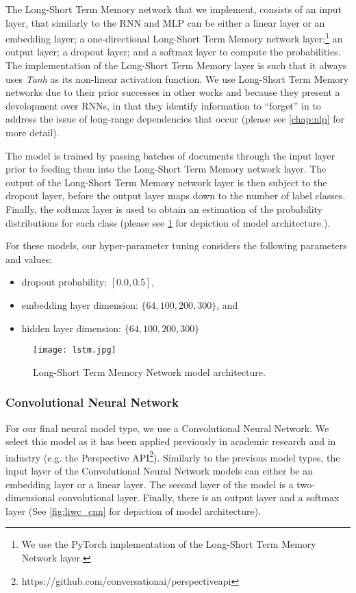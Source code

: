 The Long-Short Term Memory network that we implement, consists of an input layer, that similarly to the RNN and MLP can be either a linear layer or an embedding layer; a one-directional Long-Short Term Memory network layer;\footnote{We use the PyTorch implementation of the Long-Short Term Memory Network layer.} an output layer; a dropout layer; and a softmax layer to compute the probabilities. The implementation of the Long-Short Term Memory layer is such that it always uses \textit{Tanh} as its non-linear activation function. We use Long-Short Term Memory networks due to their prior successes in other works \cite{CITE: LSTM papers} and because they present a development over RNNs, in that they identify information to ``forget'' in to address the issue of long-range dependencies that occur (please see \cref{chap:nlp} for more detail).

The model is trained by passing batches of documents through the input layer prior to feeding them into the Long-Short Term Memory network layer. The output of the Long-Short Term Memory network layer is then subject to the dropout layer, before the output layer maps down to the number of label classes. Finally, the softmax layer is used to obtain an estimation of the probability distributions for each class (please see \cref{fig:liwc_lstm} for depiction of model architecture.).

For these models, our hyper-parameter tuning considers the following parameters and values:

\begin{itemize}
  \item dropout probability: $[0.0, 0.5]$,
  \item embedding layer dimension: $\{64, 100, 200, 300\}$, and
  \item hidden layer dimension: $\{64, 100, 200, 300\}$
\end{itemize}

\begin{figure}
  \centering
  \texttt{[image: lstm.jpg]}
  \caption{Long-Short Term Memory Network model architecture.}
  \label{fig:liwc_lstm}
\end{figure}

\subsubsection{Convolutional Neural Network}

For our final neural model type, we use a Convolutional Neural Network. We select this model as it has been applied previously in academic research \cite{CITE: CNN papers} and in industry (e.g. the Perspective API\footnote{https://github.com/conversationai/perspectiveapi}). Similarly to the previous model types, the input layer of the Convolutional Neural Network models can either be an embedding layer or a linear layer. The second layer of the model is a two-dimensional convolutional layer. Finally, there is an output layer and a softmax layer (See \cref{fig:liwc_cnn} for depiction of model architecture).

